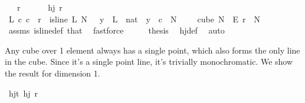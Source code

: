 \begin{isabellebody}
\ \ \ {\isachardoublequoteopen}r\ {\isachargreater}{\kern0pt}\ {}{\isachardoublequoteclose}\ \isanewline
\ \ \ {\isachardoublequoteopen}hj\ r\ {}{\isachardoublequoteclose}\isanewline
%
\isadelimproof
%
\endisadelimproof
%
\isatagproof
{}\isamarkupfalse%
{\isacharminus}{\kern0pt}\isanewline
\ \ \isamarkupfalse%
\ {\isachardoublequoteopen}{\isacharparenleft}{\kern0pt}{\isasymexists}L\ c{\isachardot}{\kern0pt}\ c\ {\isacharless}{\kern0pt}\ r\ {\isasymand}\ is{\isacharunderscore}{\kern0pt}line\ L\ N{\isacharprime}{\kern0pt}\ {}\ {\isasymand}\ {\isacharparenleft}{\kern0pt}{\isasymforall}y\ {\isasymin}\ L\ {\isacharbackquote}{\kern0pt}\ {\isacharbraceleft}{\kern0pt}{\isachardot}{\kern0pt}{\isachardot}{\kern0pt}{\isacharless}{\kern0pt}{}{\isacharcolon}{\kern0pt}{\isacharcolon}{\kern0pt}nat{\isacharbraceright}{\kern0pt}{\isachardot}{\kern0pt}\ {\isasymchi}\ y\ {\isacharequal}{\kern0pt}\ c{\isacharparenright}{\kern0pt}{\isacharparenright}{\kern0pt}{\isachardoublequoteclose}\ \ {\isachardoublequoteopen}N{\isacharprime}{\kern0pt}\ {\isasymge}\ {}{\isachardoublequoteclose}\ {\isachardoublequoteopen}{\isasymchi}\ {\isasymin}\ cube\ N{\isacharprime}{\kern0pt}\ {}\ {\isasymrightarrow}\isactrlsub E\ {\isacharbraceleft}{\kern0pt}{\isachardot}{\kern0pt}{\isachardot}{\kern0pt}{\isacharless}{\kern0pt}r{\isacharbraceright}{\kern0pt}{\isachardoublequoteclose}\ \ N{\isacharprime}{\kern0pt}\ {\isasymchi}\isanewline
\ \ \ \ \isamarkupfalse%
\ assms\ is{\isacharunderscore}{\kern0pt}line{\isacharunderscore}{\kern0pt}def\ that{\isacharparenleft}{\kern0pt}{}{\isacharparenright}{\kern0pt}\ \isamarkupfalse%
\ fastforce\isanewline
\ \ \isamarkupfalse%
\ \isamarkupfalse%
\ {\isacharquery}{\kern0pt}thesis\ \isamarkupfalse%
\ hj{\isacharunderscore}{\kern0pt}def\ \isamarkupfalse%
\ auto\isanewline
{}\isamarkupfalse%
%
\endisatagproof
{\isafoldproof}%
%
\isadelimproof
%
\endisadelimproof
%
\begin{isamarkuptext}%
Any cube over 1 element always has a single point, which also forms the only line in the cube. Since it's a single point line, it's trivially monochromatic. We show the result for dimension 1.%
\end{isamarkuptext}\isamarkuptrue%
\isamarkupfalse%
\ hj{\isacharunderscore}{\kern0pt}t{\isacharunderscore}{\kern0pt}{}{\isacharcolon}{\kern0pt}\ {\isachardoublequoteopen}hj\ r\ {}{\isachardoublequoteclose}\isanewline

\end{isabellebody}
